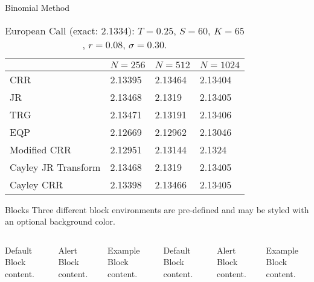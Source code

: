 \begin{frame}{Binomial Method}
	\begin{table}
		\caption{European Call (exact: 2.1334): $T=0.25$, $S=60$, $K=65$, $r=0.08$, $\sigma=0.30$.}
		\begin{tabular}{@{} llll @{}}
		\toprule
		&	$N=256$	&	$N=512$	&	$N=1024$\\
		\midrule
		CRR									& 2.13395 & 2.13464 & 2.13404\\
		JR									& 2.13468 & 2.1319  & 2.13405\\
		TRG									& 2.13471 & 2.13191 & 2.13406\\
		EQP									& 2.12669 & 2.12962 & 2.13046\\
		Modified CRR				& 2.12951 & 2.13144 & 2.1324 \\
		Cayley JR Transform	& 2.13468 & 2.1319  & 2.13405\\
		Cayley CRR					& 2.13398 & 2.13466 & 2.13405\\
		\bottomrule
	\end{tabular}
	\end{table}
\end{frame}

\begin{frame}{Blocks}
	Three different block environments are pre-defined and may be styled with an
	optional background color.
	
	\begin{columns}[T,onlytextwidth]
		\begin{block}{Default}
			Block content.
		\end{block}
		
		\begin{alertblock}{Alert}
			Block content.
		\end{alertblock}
		
		\begin{exampleblock}{Example}
			Block content.
		\end{exampleblock}
		
		
		
		\begin{block}{Default}
			Block content.
		\end{block}
		
		\begin{alertblock}{Alert}
			Block content.
		\end{alertblock}
		
		\begin{exampleblock}{Example}
			Block content.
		\end{exampleblock}
		
	\end{columns}
\end{frame}

